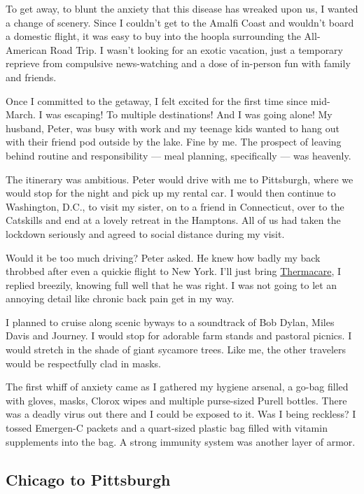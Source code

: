 To get away, to blunt the anxiety that this disease has wreaked upon us,
I wanted a change of scenery. Since I couldn't get to the Amalfi Coast
and wouldn't board a domestic flight, it was easy to buy into the hoopla
surrounding the All-American Road Trip. I wasn't looking for an exotic
vacation, just a temporary reprieve from compulsive news-watching and a
dose of in-person fun with family and friends.

Once I committed to the getaway, I felt excited for the first time since
mid-March. I was escaping! To multiple destinations! And I was going
alone! My husband, Peter, was busy with work and my teenage kids wanted
to hang out with their friend pod outside by the lake. Fine by me. The
prospect of leaving behind routine and responsibility --- meal planning,
specifically --- was heavenly.

The itinerary was ambitious. Peter would drive with me to Pittsburgh,
where we would stop for the night and pick up my rental car. I would
then continue to Washington, D.C., to visit my sister, on to a friend in
Connecticut, over to the Catskills and end at a lovely retreat in the
Hamptons. All of us had taken the lockdown seriously and agreed to
social distance during my visit.

Would it be too much driving? Peter asked. He knew how badly my back
throbbed after even a quickie flight to New York. I'll just bring
\href{https://www.thermacare.com/heat-wraps/back-pain-therapy}{Thermacare},
I replied breezily, knowing full well that he was right. I was not going
to let an annoying detail like chronic back pain get in my way.

I planned to cruise along scenic byways to a soundtrack of Bob Dylan,
Miles Davis and Journey. I would stop for adorable farm stands and
pastoral picnics. I would stretch in the shade of giant sycamore trees.
Like me, the other travelers would be respectfully clad in masks.

The first whiff of anxiety came as I gathered my hygiene arsenal, a
go-bag filled with gloves, masks, Clorox wipes and multiple purse-sized
Purell bottles. There was a deadly virus out there and I could be
exposed to it. Was I being reckless? I tossed Emergen-C packets and a
quart-sized plastic bag filled with vitamin supplements into the bag. A
strong immunity system was another layer of armor.

\hypertarget{chicago-to-pittsburgh}{%
\subsection{Chicago to Pittsburgh}\label{chicago-to-pittsburgh}}

